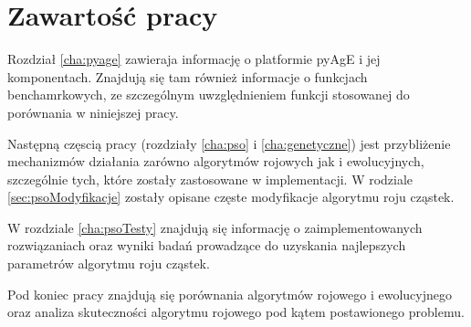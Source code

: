 \section{Zawartość pracy}
Rozdział \ref{cha:pyage} zawieraja informację o platformie pyAgE i jej komponentach. Znajdują się tam również informacje o funkcjach benchamrkowych, ze szczególnym uwzględnieniem funkcji stosowanej do porównania w niniejszej pracy.

Następną częscią pracy (rozdziały \ref{cha:pso} i \ref{cha:genetyczne}) jest przybliżenie mechanizmów działania zarówno algorytmów rojowych jak i ewolucyjnych, szczególnie tych, które zostały zastosowane w implementacji. W rodziale \ref{sec:psoModyfikacje} zostały opisane częste modyfikacje algorytmu roju cząstek.

W rozdziale \ref{cha:psoTesty} znajdują się informację o zaimplementowanych rozwiązaniach oraz wyniki badań prowadzące do uzyskania najlepszych parametrów algorytmu roju cząstek.

Pod koniec pracy znajdują się porównania algorytmów rojowego i ewolucyjnego oraz analiza skuteczności algorytmu rojowego pod kątem postawionego problemu.












